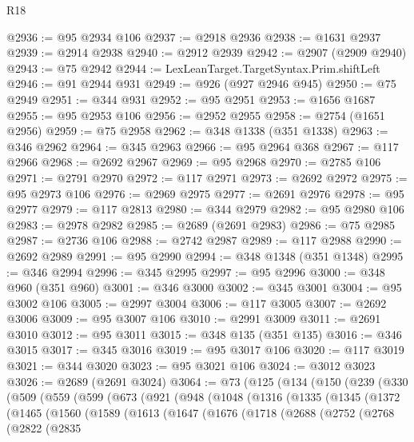 \begin{lexlean}{R18}
\begin{coremodule}
@2936 := @95 @2934 @106
@2937 := @2918 @2936
@2938 := @1631 @2937
@2939 := @2914 @2938
@2940 := @2912 @2939
@2942 := @2907 (@2909 @2940)
@2943 := @75 @2942
@2944 := LexLeanTarget.TargetSyntax.Prim.shiftLeft
@2946 := @91 @2944 @931
@2949 := @926 (@927 @2946 @945)
@2950 := @75 @2949
@2951 := @344 @931
@2952 := @95 @2951
@2953 := @1656 @1687
@2955 := @95 @2953 @106
@2956 := @2952 @2955
@2958 := @2754 (@1651 @2956)
@2959 := @75 @2958
@2962 := @348 @1338 (@351 @1338)
@2963 := @346 @2962
@2964 := @345 @2963
@2966 := @95 @2964 @368
@2967 := @117 @2966
@2968 := @2692 @2967
@2969 := @95 @2968
@2970 := @2785 @106
@2971 := @2791 @2970
@2972 := @117 @2971
@2973 := @2692 @2972
@2975 := @95 @2973 @106
@2976 := @2969 @2975
@2977 := @2691 @2976
@2978 := @95 @2977
@2979 := @117 @2813
@2980 := @344 @2979
@2982 := @95 @2980 @106
@2983 := @2978 @2982
@2985 := @2689 (@2691 @2983)
@2986 := @75 @2985
@2987 := @2736 @106
@2988 := @2742 @2987
@2989 := @117 @2988
@2990 := @2692 @2989
@2991 := @95 @2990
@2994 := @348 @1348 (@351 @1348)
@2995 := @346 @2994
@2996 := @345 @2995
@2997 := @95 @2996
@3000 := @348 @960 (@351 @960)
@3001 := @346 @3000
@3002 := @345 @3001
@3004 := @95 @3002 @106
@3005 := @2997 @3004
@3006 := @117 @3005
@3007 := @2692 @3006
@3009 := @95 @3007 @106
@3010 := @2991 @3009
@3011 := @2691 @3010
@3012 := @95 @3011
@3015 := @348 @135 (@351 @135)
@3016 := @346 @3015
@3017 := @345 @3016
@3019 := @95 @3017 @106
@3020 := @117 @3019
@3021 := @344 @3020
@3023 := @95 @3021 @106
@3024 := @3012 @3023
@3026 := @2689 (@2691 @3024)
@3064 := @73
    (@125
      (@134
        (@150
          (@239
            (@330
              (@509
                (@559
                  (@599
                    (@673
                      (@921
                        (@948
                          (@1048
                            (@1316
                              (@1335
                                (@1345
                                  (@1372
                                    (@1465
                                      (@1560
                                        (@1589
                                          (@1613
                                            (@1647
                                              (@1676
                                                (@1718
                                                  (@2688
                                                    (@2752
                                                      (@2768
                                                        (@2822
                                                          (@2835

\end{coremodule}
\end{lexlean}
